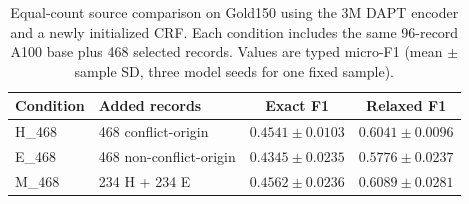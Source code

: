\begin{table}[htbp]
\caption{Equal-count source comparison on Gold150 using the 3M DAPT encoder and a newly initialized CRF. Each condition includes the same 96-record A100 base plus 468 selected records. Values are typed micro-F1 (mean $\pm$ sample SD, three model seeds for one fixed sample).}
\label{tab:hem-supplement}
\centering
\small
\begin{tabular}{@{}llcc@{}}
\toprule
Condition & Added records & Exact F1 & Relaxed F1 \\
\midrule
H\_468 & 468 conflict-origin & $0.4541\pm0.0103$ & $0.6041\pm0.0096$ \\
E\_468 & 468 non-conflict-origin & $0.4345\pm0.0235$ & $0.5776\pm0.0237$ \\
M\_468 & 234 H + 234 E & $0.4562\pm0.0236$ & $0.6089\pm0.0281$ \\
\bottomrule
\end{tabular}
\end{table}
